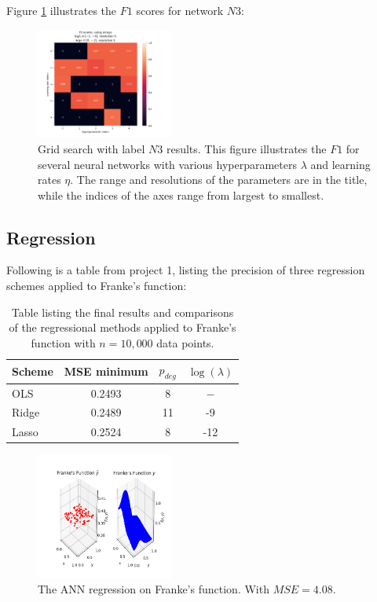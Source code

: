         Figure \ref{fig:ANNREG3} illustrates the $F1$ scores for network $N3$:
        \begin{figure}[H]
            \centering
            \includegraphics[width=0.4\textwidth]{figures/Ngrid3_F1.png}
            \caption{Grid search with label $N3$ results. This figure illustrates the $F1$ for several neural networks with various hyperparameters $\lambda$ and learning rates $\eta$. The range and resolutions of the parameters are in the title, while the indices of the axes range from largest to smallest.}
            \label{fig:ANNREG3}
        \end{figure}
        
        
    \subsection{Regression}
        Following is a table from project 1, listing the precision of three regression schemes applied to Franke's function:
        \begin{table}[H]
            \centering
            \caption{Table listing the final results and comparisons of the regressional methods applied to Franke's function with $n=10,000$ data points.}
            \begin{tabular}[t]{l@{\hskip 0.3in}c@{\hskip 0.3in}c@{\hskip 0.2in}c}
                \toprule
                Scheme & MSE minimum & $p_{deg}$ & $\log(\lambda)$ \\
                \midrule
                OLS & 0.2493 & 8 & $-$\\
                Ridge & 0.2489 & 11 & -9\\
                Lasso & 0.2524 & 8 & -12\\
                \bottomrule
            \end{tabular}
            \label{tab:conclusion_table_Frankes}
        \end{table}
        
        
        \begin{figure}[H]
            \centering
            \includegraphics[width=0.4\textwidth]{figures/regression_NNW.png}
            \caption{The ANN regression on Franke's function. With $MSE=4.08$.}
            \label{fig:ANNREG}
        \end{figure}
        
        
